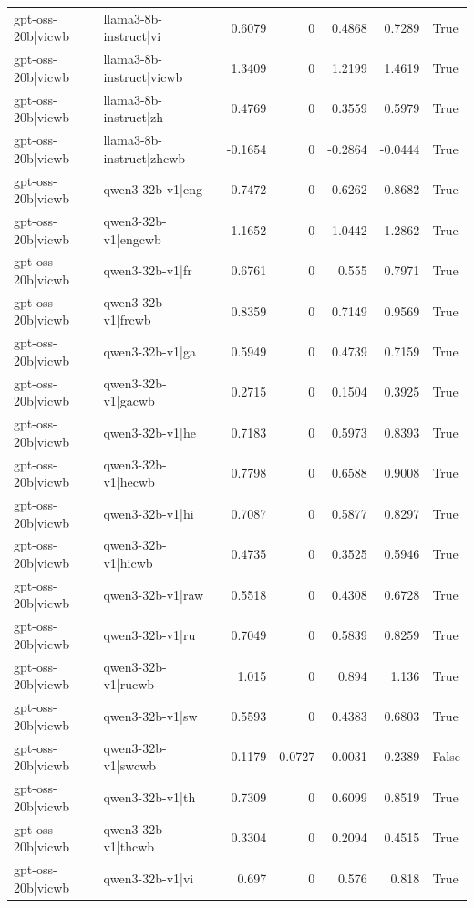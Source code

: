 \begin{table}
\begin{tabular}{l l r r r r l}
gpt-oss-20b|vicwb & llama3-8b-instruct|vi & 0.6079 & 0 & 0.4868 & 0.7289 & True \\
gpt-oss-20b|vicwb & llama3-8b-instruct|vicwb & 1.3409 & 0 & 1.2199 & 1.4619 & True \\
gpt-oss-20b|vicwb & llama3-8b-instruct|zh & 0.4769 & 0 & 0.3559 & 0.5979 & True \\
gpt-oss-20b|vicwb & llama3-8b-instruct|zhcwb & -0.1654 & 0 & -0.2864 & -0.0444 & True \\
gpt-oss-20b|vicwb & qwen3-32b-v1|eng & 0.7472 & 0 & 0.6262 & 0.8682 & True \\
gpt-oss-20b|vicwb & qwen3-32b-v1|engcwb & 1.1652 & 0 & 1.0442 & 1.2862 & True \\
gpt-oss-20b|vicwb & qwen3-32b-v1|fr & 0.6761 & 0 & 0.555 & 0.7971 & True \\
gpt-oss-20b|vicwb & qwen3-32b-v1|frcwb & 0.8359 & 0 & 0.7149 & 0.9569 & True \\
gpt-oss-20b|vicwb & qwen3-32b-v1|ga & 0.5949 & 0 & 0.4739 & 0.7159 & True \\
gpt-oss-20b|vicwb & qwen3-32b-v1|gacwb & 0.2715 & 0 & 0.1504 & 0.3925 & True \\
gpt-oss-20b|vicwb & qwen3-32b-v1|he & 0.7183 & 0 & 0.5973 & 0.8393 & True \\
gpt-oss-20b|vicwb & qwen3-32b-v1|hecwb & 0.7798 & 0 & 0.6588 & 0.9008 & True \\
gpt-oss-20b|vicwb & qwen3-32b-v1|hi & 0.7087 & 0 & 0.5877 & 0.8297 & True \\
gpt-oss-20b|vicwb & qwen3-32b-v1|hicwb & 0.4735 & 0 & 0.3525 & 0.5946 & True \\
gpt-oss-20b|vicwb & qwen3-32b-v1|raw & 0.5518 & 0 & 0.4308 & 0.6728 & True \\
gpt-oss-20b|vicwb & qwen3-32b-v1|ru & 0.7049 & 0 & 0.5839 & 0.8259 & True \\
gpt-oss-20b|vicwb & qwen3-32b-v1|rucwb & 1.015 & 0 & 0.894 & 1.136 & True \\
gpt-oss-20b|vicwb & qwen3-32b-v1|sw & 0.5593 & 0 & 0.4383 & 0.6803 & True \\
gpt-oss-20b|vicwb & qwen3-32b-v1|swcwb & 0.1179 & 0.0727 & -0.0031 & 0.2389 & False \\
gpt-oss-20b|vicwb & qwen3-32b-v1|th & 0.7309 & 0 & 0.6099 & 0.8519 & True \\
gpt-oss-20b|vicwb & qwen3-32b-v1|thcwb & 0.3304 & 0 & 0.2094 & 0.4515 & True \\
gpt-oss-20b|vicwb & qwen3-32b-v1|vi & 0.697 & 0 & 0.576 & 0.818 & True \\

\end{tabular}
\end{table}
